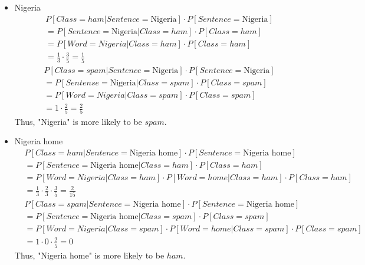 \documentclass[twoside,11pt]{homework}
\begin{document}
\begin{solution}
$ $
  \begin{itemize}
  \item Nigeria
  \[
    \begin{aligned}
      & P[Class = ham | Sentence = \text{Nigeria}] \cdot P[Sentence = \text{Nigeria}] \\
      &= P[Sentence = \text{Nigeria} | Class = ham] \cdot P[Class = ham] \\
      &= P[Word = Nigeria | Class = ham] \cdot P[Class = ham] \\
      &= \frac{1}{3} \cdot \frac{3}{5} = \frac{1}{5}
    \end{aligned}
  \]
  \[
    \begin{aligned}
      & P[Class = spam | Sentence = \text{Nigeria}] \cdot P[Sentence = \text{Nigeria}] \\
      &= P[ Sentense = \text{Nigeria} | Class = spam] \cdot P[Class = spam] \\
      &= P[ Word = Nigeria | Class = spam] \cdot P[Class = spam] \\
      &= 1 \cdot \frac{2}{5} = \frac{2}{5}
    \end{aligned}
  \]
  Thus, "Nigeria" is more likely to be $spam$.

  \item Nigeria home
  \[
    \begin{aligned}
      & P[Class = ham | Sentence = \text{Nigeria home}] \cdot P[Sentence = \text{Nigeria home}] \\
      &= P[Sentence = \text{Nigeria home} | Class = ham] \cdot P[Class = ham] \\
      &= P[Word = Nigeria | Class = ham] \cdot P[Word = home | Class = ham] \cdot P[Class = ham] \\
      &= \frac{1}{3} \cdot \frac{2}{3} \cdot \frac{3}{5} = \frac{2}{15}
    \end{aligned}
  \]
  \[
    \begin{aligned}
      & P[Class = spam | Sentence = \text{Nigeria home}] \cdot P[Sentence = \text{Nigeria home}] \\
      &= P[Sentence = \text{Nigeria home} | Class = spam] \cdot P[Class = spam] \\
      &= P[Word = Nigeria | Class = spam] \cdot P[Word = home | Class = spam] \cdot P[Class = spam] \\
      &= 1 \cdot 0 \cdot \frac{2}{5} = 0
    \end{aligned}
  \]
  Thus, "Nigeria home" is more likely to be $ham$.


\end{itemize}
\end{solution}
\end{document}
